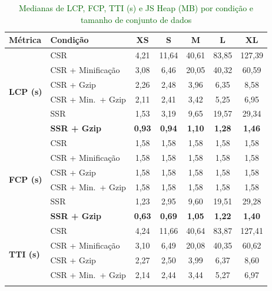 \begin{table}[!t]
\centering
\footnotesize
\caption{\textcolor{darkgreen}{Medianas de LCP, FCP, TTI (s) e JS Heap (MB) por condição e tamanho de conjunto de dados}}
\label{tab:extended_medians}
\begin{tabular}{|l|l|c|c|c|c|c|}
\hline
\textbf{Métrica} & \textbf{Condição} & \textbf{XS} & \textbf{S} & \textbf{M} & \textbf{L} & \textbf{XL} \\
\hline
\multirow{6}{*}{\textbf{LCP (s)}}
  & CSR                       & 4,21  & 11,64 & 40,61 & 83,85  & 127,39 \\ \cline{2-7}
  & CSR + Minificação         & 3,08  &  6,46 & 20,05 & 40,32  &  60,59 \\ \cline{2-7}
  & CSR + Gzip                & 2,26  &  2,48 &  3,96 &  6,35  &   8,58 \\ \cline{2-7}
  & CSR + Min.\ + Gzip        & 2,11  &  2,41 &  3,42 &  5,25  &   6,95 \\ \cline{2-7}
  & SSR                       & 1,53  &  3,19 &  9,65 & 19,57  &  29,34 \\ \cline{2-7}
  & \textbf{SSR + Gzip}       & \textbf{0,93} & \textbf{0,94} & \textbf{1,10} & \textbf{1,28} & \textbf{1,46} \\
\hline
\multirow{6}{*}{\textbf{FCP (s)}}
  & CSR                       & 1,58  & 1,58  & 1,58  &  1,58  &  1,58 \\ \cline{2-7}
  & CSR + Minificação         & 1,58  & 1,58  & 1,58  &  1,58  &  1,58 \\ \cline{2-7}
  & CSR + Gzip                & 1,58  & 1,58  & 1,58  &  1,58  &  1,58 \\ \cline{2-7}
  & CSR + Min.\ + Gzip        & 1,58  & 1,58  & 1,58  &  1,58  &  1,58 \\ \cline{2-7}
  & SSR                       & 1,23  & 2,95  & 9,60  & 19,51  & 29,28 \\ \cline{2-7}
  & \textbf{SSR + Gzip}       & \textbf{0,63} & \textbf{0,69} & \textbf{1,05} & \textbf{1,22} & \textbf{1,40} \\
\hline
\multirow{6}{*}{\textbf{TTI (s)}}
  & CSR                       & 4,24  & 11,66 & 40,64 & 83,87  & 127,41 \\ \cline{2-7}
  & CSR + Minificação         & 3,10  &  6,49 & 20,08 & 40,35  &  60,62 \\ \cline{2-7}
  & CSR + Gzip                & 2,27  &  2,50 &  3,99 &  6,37  &   8,60 \\ \cline{2-7}
  & CSR + Min.\ + Gzip        & 2,14  &  2,44 &  3,44 &  5,27  &   6,97 \\ \cline{2-7}

\end{tabular}
\end{table}
